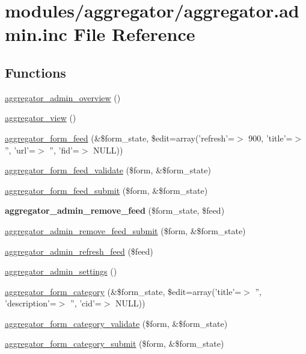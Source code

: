 \hypertarget{aggregator_8admin_8inc}{
\section{modules/aggregator/aggregator.admin.inc File Reference}
\label{aggregator_8admin_8inc}
}
\subsection*{Functions}
\begin{CompactItemize}
\item 
\hyperlink{aggregator_8admin_8inc_9fe4f30b63dd656ba52c3af570556272}{aggregator\_\-admin\_\-overview} ()
\item 
\hyperlink{aggregator_8admin_8inc_dbb245c75bc2cb47e784fb454e134594}{aggregator\_\-view} ()
\item 
\hyperlink{group__forms_gf9a13eb9b0448eec9662f0b73c930bca}{aggregator\_\-form\_\-feed} (\&\$form\_\-state, \$edit=array('refresh'=$>$ 900, 'title'=$>$ '', 'url'=$>$ '', 'fid'=$>$ NULL))
\item 
\hyperlink{aggregator_8admin_8inc_4a4b42f6a1e73d72fb1e55c0f20fcf02}{aggregator\_\-form\_\-feed\_\-validate} (\$form, \&\$form\_\-state)
\item 
\hyperlink{aggregator_8admin_8inc_f98f428f07034e19622342875fe30984}{aggregator\_\-form\_\-feed\_\-submit} (\$form, \&\$form\_\-state)
\item 
\hypertarget{aggregator_8admin_8inc_108f63a934f48ac0ba7de1a055655a40}{
\textbf{aggregator\_\-admin\_\-remove\_\-feed} (\$form\_\-state, \$feed)}
\label{aggregator_8admin_8inc_108f63a934f48ac0ba7de1a055655a40}

\item 
\hyperlink{aggregator_8admin_8inc_6129f0a0c72d8e0ada1fb2f4cd40519d}{aggregator\_\-admin\_\-remove\_\-feed\_\-submit} (\$form, \&\$form\_\-state)
\item 
\hyperlink{aggregator_8admin_8inc_eb33d62d98fcdc9c66379002613f497b}{aggregator\_\-admin\_\-refresh\_\-feed} (\$feed)
\item 
\hyperlink{group__forms_gfd14b28c0d63cab57fe23fbbb60bc479}{aggregator\_\-admin\_\-settings} ()
\item 
\hyperlink{group__forms_g2d93d2170760482c7f1fc28ae1549769}{aggregator\_\-form\_\-category} (\&\$form\_\-state, \$edit=array('title'=$>$ '', 'description'=$>$ '', 'cid'=$>$ NULL))
\item 
\hyperlink{aggregator_8admin_8inc_419c55e35895dea1f41d5b31908883d5}{aggregator\_\-form\_\-category\_\-validate} (\$form, \&\$form\_\-state)
\item 
\hyperlink{aggregator_8admin_8inc_56c1cadf416d17bd8dd8a53cc6ed5aeb}{aggregator\_\-form\_\-category\_\-submit} (\$form, \&\$form\_\-state)
\end{CompactItemize}


